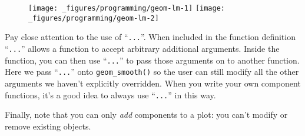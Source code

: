\begin{Shaded}
\begin{Highlighting}[]
\StringTok{ } \StringTok{ } \NormalTok{(}\NormalTok{, }\NormalTok{), }
                     
  \NormalTok{(}  \NormalTok{, } \NormalTok{, } 
     
\NormalTok{\}}
 \NormalTok{/}\StringTok{ }\StringTok{ }
\StringTok{  }\NormalTok{() +}\StringTok{ }
\StringTok{  }\NormalTok{()}
 \NormalTok{/}\StringTok{ }\StringTok{ }
\StringTok{  }\NormalTok{() +}\StringTok{ }
\StringTok{  }\StringTok{ }\NormalTok{), } \NormalTok{, } \NormalTok{)}
\end{Highlighting}
\end{Shaded}

\begin{figure}[H]
  \centering
  \texttt{[image: \_figures/programming/geom-lm-1]}%
  \texttt{[image: \_figures/programming/geom-lm-2]}
\end{figure}

Pay close attention to the use of ``\texttt{...}''. When included in the
function definition ``\texttt{...}'' allows a function to accept
arbitrary additional arguments. Inside the function, you can then use
``\texttt{...}'' to pass those arguments on to another function. Here we
pass ``\texttt{...}'' onto \texttt{geom\_smooth()} so the user can still
modify all the other arguments we haven't explicitly overridden. When
you write your own component functions, it's a good idea to always use
``\texttt{...}'' in this way. 

Finally, note that you can only \emph{add} components to a plot: you
can't modify or remove existing objects.

